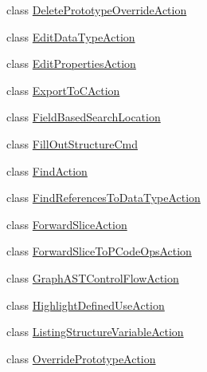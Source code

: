 \begin{DoxyCompactItemize}
\item 
class \mbox{\hyperlink{classghidra_1_1app_1_1plugin_1_1core_1_1decompile_1_1actions_1_1_delete_prototype_override_action}{Delete\+Prototype\+Override\+Action}}
\item 
class \mbox{\hyperlink{classghidra_1_1app_1_1plugin_1_1core_1_1decompile_1_1actions_1_1_edit_data_type_action}{Edit\+Data\+Type\+Action}}
\item 
class \mbox{\hyperlink{classghidra_1_1app_1_1plugin_1_1core_1_1decompile_1_1actions_1_1_edit_properties_action}{Edit\+Properties\+Action}}
\item 
class \mbox{\hyperlink{classghidra_1_1app_1_1plugin_1_1core_1_1decompile_1_1actions_1_1_export_to_c_action}{Export\+To\+C\+Action}}
\item 
class \mbox{\hyperlink{classghidra_1_1app_1_1plugin_1_1core_1_1decompile_1_1actions_1_1_field_based_search_location}{Field\+Based\+Search\+Location}}
\item 
class \mbox{\hyperlink{classghidra_1_1app_1_1plugin_1_1core_1_1decompile_1_1actions_1_1_fill_out_structure_cmd}{Fill\+Out\+Structure\+Cmd}}
\item 
class \mbox{\hyperlink{classghidra_1_1app_1_1plugin_1_1core_1_1decompile_1_1actions_1_1_find_action}{Find\+Action}}
\item 
class \mbox{\hyperlink{classghidra_1_1app_1_1plugin_1_1core_1_1decompile_1_1actions_1_1_find_references_to_data_type_action}{Find\+References\+To\+Data\+Type\+Action}}
\item 
class \mbox{\hyperlink{classghidra_1_1app_1_1plugin_1_1core_1_1decompile_1_1actions_1_1_forward_slice_action}{Forward\+Slice\+Action}}
\item 
class \mbox{\hyperlink{classghidra_1_1app_1_1plugin_1_1core_1_1decompile_1_1actions_1_1_forward_slice_to_p_code_ops_action}{Forward\+Slice\+To\+P\+Code\+Ops\+Action}}
\item 
class \mbox{\hyperlink{classghidra_1_1app_1_1plugin_1_1core_1_1decompile_1_1actions_1_1_graph_a_s_t_control_flow_action}{Graph\+A\+S\+T\+Control\+Flow\+Action}}
\item 
class \mbox{\hyperlink{classghidra_1_1app_1_1plugin_1_1core_1_1decompile_1_1actions_1_1_highlight_defined_use_action}{Highlight\+Defined\+Use\+Action}}
\item 
class \mbox{\hyperlink{classghidra_1_1app_1_1plugin_1_1core_1_1decompile_1_1actions_1_1_listing_structure_variable_action}{Listing\+Structure\+Variable\+Action}}
\item 
class \mbox{\hyperlink{classghidra_1_1app_1_1plugin_1_1core_1_1decompile_1_1actions_1_1_override_prototype_action}{Override\+Prototype\+Action}}

\end{DoxyCompactItemize}
